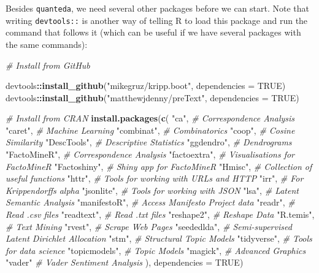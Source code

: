 \documentclass[
]{book}
\newenvironment{Shaded}{\begin{snugshade}}{\end{snugshade}}
\newcommand{\AttributeTok}[1]{\textcolor[rgb]{0.13,0.29,0.53}{#1}}
\newcommand{\CommentTok}[1]{\textcolor[rgb]{0.56,0.35,0.01}{\textit{#1}}}
\newcommand{\ConstantTok}[1]{\textcolor[rgb]{0.56,0.35,0.01}{#1}}
\newcommand{\FunctionTok}[1]{\textcolor[rgb]{0.13,0.29,0.53}{\textbf{#1}}}
\newcommand{\NormalTok}[1]{#1}
\newcommand{\SpecialCharTok}[1]{\textcolor[rgb]{0.81,0.36,0.00}{\textbf{#1}}}
\newcommand{\StringTok}[1]{\textcolor[rgb]{0.31,0.60,0.02}{#1}}
\begin{document}
Besides \texttt{quanteda}, we need several other packages before we can start. Note that writing \texttt{devtools::} is another way of telling R to load this package and run the command that follows it (which can be useful if we have several packages with the same commands):

\begin{Shaded}
\begin{Highlighting}[]
\CommentTok{\# Install from GitHub}

\NormalTok{devtools}\SpecialCharTok{::}\FunctionTok{install\_github}\NormalTok{(}\StringTok{"mikegruz/kripp.boot"}\NormalTok{, }\AttributeTok{dependencies =} \ConstantTok{TRUE}\NormalTok{)}
\NormalTok{devtools}\SpecialCharTok{::}\FunctionTok{install\_github}\NormalTok{(}\StringTok{"matthewjdenny/preText"}\NormalTok{, }\AttributeTok{dependencies =} \ConstantTok{TRUE}\NormalTok{)}

\CommentTok{\# Install from CRAN}
\FunctionTok{install.packages}\NormalTok{(}\FunctionTok{c}\NormalTok{(}
  \StringTok{"ca"}\NormalTok{,           }\CommentTok{\# Correspondence Analysis}
  \StringTok{"caret"}\NormalTok{,        }\CommentTok{\# Machine Learning}
  \StringTok{"combinat"}\NormalTok{,     }\CommentTok{\# Combinatorics}
  \StringTok{"coop"}\NormalTok{,         }\CommentTok{\# Cosine Similarity}
  \StringTok{"DescTools"}\NormalTok{,    }\CommentTok{\# Descriptive Statistics}
  \StringTok{"ggdendro"}\NormalTok{,     }\CommentTok{\# Dendrograms}
  \StringTok{"FactoMineR"}\NormalTok{,   }\CommentTok{\# Correspondence Analysis}
  \StringTok{"factoextra"}\NormalTok{,   }\CommentTok{\# Visualisations for FactoMineR}
  \StringTok{"Factoshiny"}\NormalTok{,   }\CommentTok{\# Shiny app for FactoMineR}
  \StringTok{"Hmisc"}\NormalTok{,        }\CommentTok{\# Collection of useful functions}
  \StringTok{"httr"}\NormalTok{,         }\CommentTok{\# Tools for working with URLs and HTTP}
  \StringTok{"irr"}\NormalTok{,          }\CommentTok{\# For Krippendorff\textquotesingle{}s alpha}
  \StringTok{"jsonlite"}\NormalTok{,     }\CommentTok{\# Tools for working with JSON}
  \StringTok{"lsa"}\NormalTok{,          }\CommentTok{\# Latent Semantic Analysis}
  \StringTok{"manifestoR"}\NormalTok{,   }\CommentTok{\# Access Manifesto Project data}
  \StringTok{"readr"}\NormalTok{,        }\CommentTok{\# Read .csv files}
  \StringTok{"readtext"}\NormalTok{,     }\CommentTok{\# Read .txt files}
  \StringTok{"reshape2"}\NormalTok{,     }\CommentTok{\#  Reshape Data}
  \StringTok{"R.temis"}\NormalTok{,      }\CommentTok{\# Text Mining}
  \StringTok{"rvest"}\NormalTok{,        }\CommentTok{\# Scrape Web Pages}
  \StringTok{"seededlda"}\NormalTok{,    }\CommentTok{\# Semi{-}supervised Latent Dirichlet Allocation}
  \StringTok{"stm"}\NormalTok{,          }\CommentTok{\# Structural Topic Models}
  \StringTok{"tidyverse"}\NormalTok{,    }\CommentTok{\# Tools for data science}
  \StringTok{"topicmodels"}\NormalTok{,  }\CommentTok{\# Topic Models}
  \StringTok{"magick"}\NormalTok{,       }\CommentTok{\# Advanced Graphics}
  \StringTok{"vader"}         \CommentTok{\# Vader Sentiment Analysis}
\NormalTok{), }\AttributeTok{dependencies =} \ConstantTok{TRUE}\NormalTok{)}
\end{Highlighting}
\end{Shaded}
\end{document}
